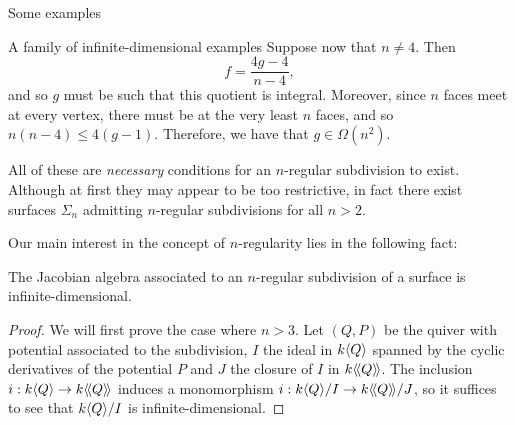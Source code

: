 \begin{chapter}{Some examples}
\begin{section}{A family of infinite-dimensional examples}
Suppose now that $n\neq 4$. Then
\begin{equation}
\label{euler-regular}f=\frac{4g-4}{n-4},
\end{equation}and so $g$ must be such that this quotient is integral. Moreover, since $n$ faces meet at every vertex, there must be at the very least $n$ faces, and so $n(n-4)\leq 4(g-1)$. Therefore, we have that $g\in \Omega(n^2)$.

All of these are \emph{necessary} conditions for an $n$-regular subdivision to exist. Although at first they may appear to be too restrictive, in fact there exist surfaces $\Sigma_n$ admitting $n$-regular subdivisions for all $n>2$. \note{\textcolor{red}{completar esto cuando lo tengamos, si es que es cierto :)}}

Our main interest in the concept of $n$-regularity lies in the following fact:

\begin{thm} The Jacobian algebra associated to an $n$-regular subdivision of a surface is infinite-dimensional.
\end{thm}
\begin{proof} We will first prove the case where $n>3$. Let $(Q,P)$ be the quiver with potential associated to the subdivision, $I$ the ideal in $k\langle Q\rangle$ spanned by the cyclic derivatives of the potential $P$ and $J$ the closure of $I$ in $k\langle\!\langle Q\rangle\!\rangle$. The inclusion $i:k\langle Q\rangle\to k\langle\!\langle Q\rangle\!\rangle$ induces a monomorphism $i:k\langle Q\rangle/I \to k\langle\!\langle Q\rangle\!\rangle/J$, so it suffices to see that $k\langle Q\rangle/I$ is infinite-dimensional. 


\end{proof}
\end{section}
\end{chapter}
